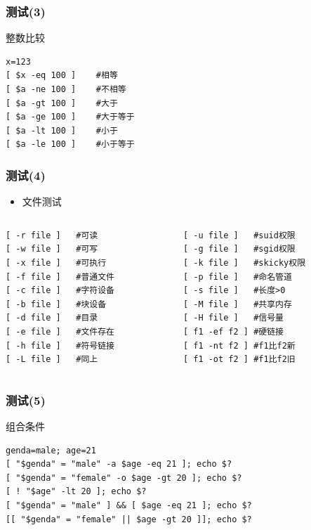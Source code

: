 \documentclass[xcolor=svgnames,presentation]{beamer}
\begin{document}
\begin{frame}[fragile]
\frametitle{测试(3)}
\label{sec-1-2-27}
\begin{exampleblock}{整数比较}
\label{sec-1-2-27-1}


\begin{verbatim}
x=123
[ $x -eq 100 ]    #相等
[ $a -ne 100 ]    #不相等
[ $a -gt 100 ]    #大于
[ $a -ge 100 ]    #大于等于
[ $a -lt 100 ]    #小于
[ $a -le 100 ]    #小于等于
\end{verbatim}
\end{exampleblock}
\end{frame}
\begin{frame}[fragile]
\frametitle{测试(4)}
\label{sec-1-2-28}
\begin{itemize}

\item 文件测试
\label{sec-1-2-28-1}%
\end{itemize} %
\begin{columns}
\begin{column}{0.5\textwidth}
\label{sec-1-2-28-2}


\begin{verbatim}
[ -r file ]   #可读
[ -w file ]   #可写
[ -x file ]   #可执行
[ -f file ]   #普通文件
[ -c file ]   #字符设备
[ -b file ]   #块设备
[ -d file ]   #目录
[ -e file ]   #文件存在
[ -h file ]   #符号链接
[ -L file ]   #同上
\end{verbatim}
\end{column}
\begin{column}{0.5\textwidth}
\label{sec-1-2-28-3}


\begin{verbatim}
[ -u file ]   #suid权限
[ -g file ]   #sgid权限
[ -k file ]   #skicky权限
[ -p file ]   #命名管道
[ -s file ]   #长度>0
[ -M file ]   #共享内存
[ -H file ]   #信号量
[ f1 -ef f2 ] #硬链接
[ f1 -nt f2 ] #f1比f2新
[ f1 -ot f2 ] #f1比f2旧
\end{verbatim}
\end{column}
\end{columns}
\end{frame}
\begin{frame}[fragile]
\frametitle{测试(5)}
\label{sec-1-2-29}
\begin{exampleblock}{组合条件}
\label{sec-1-2-29-1}


\begin{verbatim}
genda=male; age=21
[ "$genda" = "male" -a $age -eq 21 ]; echo $?
[ "$genda" = "female" -o $age -gt 20 ]; echo $?
[ ! "$age" -lt 20 ]; echo $?
[ "$genda" = "male" ] && [ $age -eq 21 ]; echo $?
[[ "$genda" = "female" || $age -gt 20 ]]; echo $?
\end{verbatim}
\end{exampleblock}
\end{frame}
\end{document}
